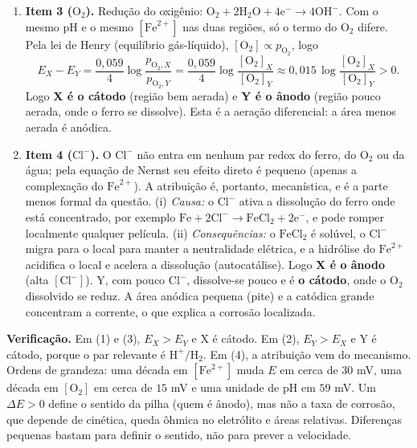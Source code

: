 \documentclass{article}%
\begin{document}
\begin{enumerate}
\item \textbf{Item 3 ($\mathrm{O}_2$).} Redução do oxigênio: $\mathrm{O}_2 + 2\mathrm{H}_2\mathrm{O} + 4\mathrm{e}^- \rightarrow 4\mathrm{OH}^-$. Com o mesmo $\mathrm{pH}$ e o mesmo $[\mathrm{Fe}^{2+}]$ nas duas regiões, só o termo do $\mathrm{O}_2$ difere. Pela lei de Henry (equilíbrio gás-líquido), $[\mathrm{O}_2] \propto p_{\mathrm{O}_2}$, logo
\[
E_X - E_Y = \frac{0{,}059}{4}\log\frac{p_{\mathrm{O}_2,X}}{p_{\mathrm{O}_2,Y}} = \frac{0{,}059}{4}\log\frac{[\mathrm{O}_2]_X}{[\mathrm{O}_2]_Y} \approx 0{,}015\,\log\frac{[\mathrm{O}_2]_X}{[\mathrm{O}_2]_Y} > 0.
\]
Logo \textbf{X é o cátodo} (região bem aerada) e \textbf{Y é o ânodo} (região pouco aerada, onde o ferro se dissolve). Esta é a aeração diferencial: a área menos aerada é anódica.

\item \textbf{Item 4 ($\mathrm{Cl}^-$).} O $\mathrm{Cl}^-$ não entra em nenhum par redox do ferro, do $\mathrm{O}_2$ ou da água; pela equação de Nernst seu efeito direto é pequeno (apenas a complexação do $\mathrm{Fe}^{2+}$). A atribuição é, portanto, mecanística, e é a parte menos formal da questão. (i) \textit{Causa:} o $\mathrm{Cl}^-$ ativa a dissolução do ferro onde está concentrado, por exemplo $\mathrm{Fe} + 2\mathrm{Cl}^- \rightarrow \mathrm{FeCl}_2 + 2\mathrm{e}^-$, e pode romper localmente qualquer película. (ii) \textit{Consequências:} o $\mathrm{FeCl}_2$ é solúvel, o $\mathrm{Cl}^-$ migra para o local para manter a neutralidade elétrica, e a hidrólise do $\mathrm{Fe}^{2+}$ acidifica o local e acelera a dissolução (autocatálise). Logo \textbf{X é o ânodo} (alta $[\mathrm{Cl}^-]$). Y, com pouco $\mathrm{Cl}^-$, dissolve-se pouco e é \textbf{o cátodo}, onde o $\mathrm{O}_2$ dissolvido se reduz. A área anódica pequena (pite) e a catódica grande concentram a corrente, o que explica a corrosão localizada.
\end{enumerate}

\textbf{Verificação.} Em (1) e (3), $E_X > E_Y$ e X é cátodo. Em (2), $E_Y > E_X$ e Y é cátodo, porque o par relevante é $\mathrm{H}^+/\mathrm{H}_2$. Em (4), a atribuição vem do mecanismo. Ordens de grandeza: uma década em $[\mathrm{Fe}^{2+}]$ muda $E$ em cerca de $30$ mV, uma década em $[\mathrm{O}_2]$ em cerca de $15$ mV e uma unidade de $\mathrm{pH}$ em $59$ mV. Um $\Delta E > 0$ define o sentido da pilha (quem é ânodo), mas não a taxa de corrosão, que depende de cinética, queda ôhmica no eletrólito e áreas relativas. Diferenças pequenas bastam para definir o sentido, não para prever a velocidade.
\end{document}
